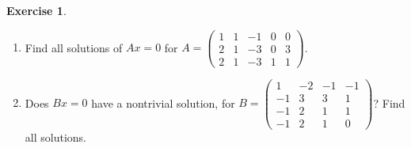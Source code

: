 \documentclass[12pt]{article}
\theoremstyle{definition}
\newtheorem{exercise}{Exercise}
\begin{document}
\begin{exercise}\label{r2-dr-homogeneous}
\begin{enumerate}
\item Find all solutions of \(Ax=0\) for
\(A=\begin{pmatrix}1&1&-1&0&0\\2&1&-3&0&3\\2&1&-3&1&1\end{pmatrix}\).
\item Does \(Bx=0\) have a nontrivial solution, for
\(B=\begin{pmatrix}1&-2&-1&-1\\-1&3&3&1\\-1&2&1&1\\-1&2&1&0\end{pmatrix}\)? Find all solutions.
\end{enumerate}
\end{exercise}
\end{document}
